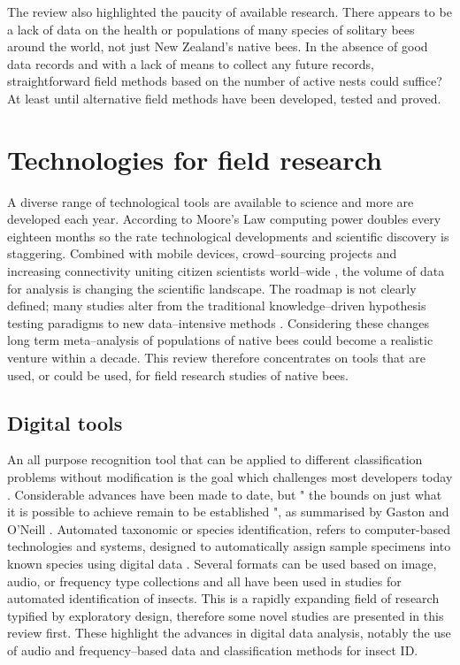 The review also highlighted the paucity of available research. There appears to be a lack of data on the health or populations of many species of solitary bees around the world, not just New Zealand's native bees. In the absence of good data records and with a lack of means to collect any future records, straightforward field methods based on the number of active nests could suffice? At least until alternative field methods have been developed, tested and proved. 


\section{Technologies for field research}\label{sec:technologies-for-field-research}
A diverse range of technological tools are available to science and more are developed each year. According to Moore's Law computing power doubles every eighteen months \cite{Schaller1997,Mack2015} so the rate technological developments and scientific discovery is staggering. Combined with mobile devices, crowd--sourcing projects and increasing connectivity uniting citizen scientists world--wide \cite{Irwin1995}, the volume of data for analysis is changing the scientific landscape. The roadmap is not clearly defined; many studies alter from the traditional knowledge--driven hypothesis testing paradigms to new data--intensive methods \cite{Kelling2009,Catlin2012}. Considering these changes long term meta--analysis of populations of native bees could become a realistic venture within a decade. This review therefore concentrates on tools that are used, or could be used, for field research studies of native bees.

\subsection{Digital tools}\label{sec:digital-tools}
An all purpose recognition tool that can be applied to different classification problems without modification is the goal which challenges most developers today \cite{Mortensen2007,Gaston2004}. Considerable advances have been made to date, but " the bounds on just what it is possible to achieve remain to be established ", as summarised by Gaston and O'Neill \cite[p.12]{Gaston2004}. Automated taxonomic or species identification, refers to computer-based technologies and systems, designed to automatically assign sample specimens into known species using digital data \cite{Gaston2004}. Several formats can be used based on image, audio, or frequency type collections and all have been used in studies for automated identification of insects. This is a rapidly expanding field of research \cite{Macleod2007} typified by exploratory design, therefore some novel studies are presented in this review first. These highlight the advances in digital data analysis, notably the use of audio and frequency--based data and classification methods for insect ID.

